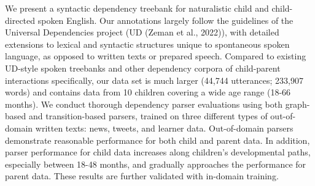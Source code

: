 We present a syntactic dependency treebank for naturalistic child and child-directed spoken English. Our annotations largely follow the guidelines of the Universal Dependencies project (UD (Zeman et al., 2022)), with detailed extensions to lexical and syntactic structures unique to spontaneous spoken language, as opposed to written texts or prepared speech. Compared to existing UD-style spoken treebanks and other dependency corpora of child-parent interactions specifically, our data set is much larger (44,744 utterances; 233,907 words) and contains data from 10 children covering a wide age range (18-66 months). We conduct thorough dependency parser evaluations using both graph-based and transition-based parsers, trained on three different types of out-of-domain written texts: news, tweets, and learner data. Out-of-domain parsers demonstrate reasonable performance for both child and parent data. In addition, parser performance for child data increases along children's developmental paths, especially between 18-48 months, and gradually approaches the performance for parent data. These results are further validated with in-domain training.